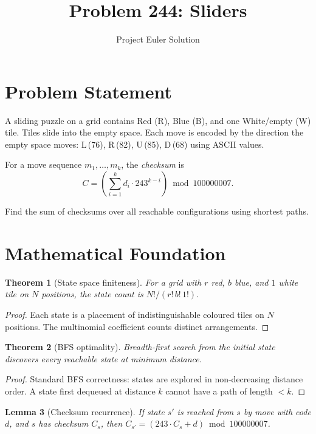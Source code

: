 \documentclass[12pt]{article}
\title{Problem 244: Sliders}
\author{Project Euler Solution}
\date{}
\newtheorem{theorem}{Theorem}
\newtheorem{lemma}[theorem]{Lemma}
\begin{document}
\maketitle

\section{Problem Statement}

A sliding puzzle on a grid contains Red (R), Blue (B), and one White/empty (W) tile. Tiles slide into the empty space. Each move is encoded by the direction the empty space moves: L\,(76), R\,(82), U\,(85), D\,(68) using ASCII values.

For a move sequence $m_1,\ldots,m_k$, the \emph{checksum} is
\[
C=\left(\sum_{i=1}^{k}d_i\cdot 243^{k-i}\right)\bmod 100000007.
\]

Find the sum of checksums over all reachable configurations using shortest paths.

\section{Mathematical Foundation}

\begin{theorem}[State space finiteness]
For a grid with $r$ red, $b$ blue, and $1$ white tile on $N$ positions, the state count is $N!/(r!\,b!\,1!)$.
\end{theorem}

\begin{proof}
Each state is a placement of indistinguishable coloured tiles on $N$ positions. The multinomial coefficient counts distinct arrangements.
\end{proof}

\begin{theorem}[BFS optimality]
Breadth-first search from the initial state discovers every reachable state at minimum distance.
\end{theorem}

\begin{proof}
Standard BFS correctness: states are explored in non-decreasing distance order. A state first dequeued at distance $k$ cannot have a path of length $<k$.
\end{proof}

\begin{lemma}[Checksum recurrence]\label{lem:checksum}
If state $s'$ is reached from $s$ by move with code $d$, and $s$ has checksum $C_s$, then $C_{s'}=(243\cdot C_s+d)\bmod 100000007$.
\end{lemma}
\end{document}
